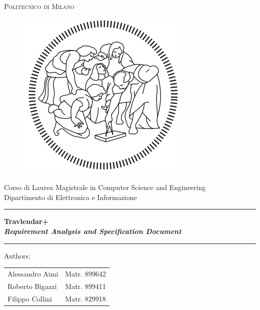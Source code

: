 \documentclass[a4paper,12pt,twoside]{report}
\begin{document}

\thispagestyle{empty}
\enlargethispage{60mm}
\begin{center}
\Large{\textsc{Politecnico di Milano}}\\
\begin{figure}[h]
\begin{center}
\includegraphics[scale=0.25]{images/logoPolimi.png}
\end{center}
\end{figure}
\vspace{-7mm}
\large{Corso di Laurea Magistrale in Computer Science and Engineering}\\
\large{Dipartimento di Elettronica e Informazione}\\
\vspace{25mm}

\begin{center}
\noindent\rule{17cm}{0.4pt}
\end{center}

{\textbf{\Huge{Travlendar+}}} \\
\vspace{5mm}
{\textbf{\textit{\Large{Requirement Analysis and Specification Document}}}}


\noindent\rule{17cm}{0.4pt}

\vspace{35mm}

\begin{center}
Authors:
\vspace{-3mm}
\end{center}
\begin{center}
\begin{tabular}{l l }
Alessandro Aimi & Matr. 899642 \\
Roberto Bigazzi & Matr. 899411 \\
Filippo Collini & Matr. 829918
\end{tabular}
\end{center}
\vspace{20mm}


\end{center}
\end{document}
